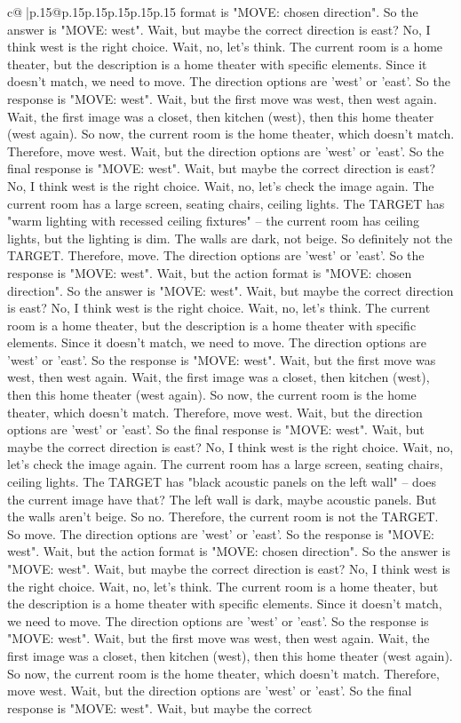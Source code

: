 \documentclass{article}
\begin{document}
{\begin{supertabular}{c@{$\;$}|p{.15\linewidth}@{}p{.15\linewidth}p{.15\linewidth}p{.15\linewidth}p{.15\linewidth}p{.15\linewidth}}
{{{format is "MOVE: chosen direction". So the answer is "MOVE: west". Wait, but maybe the correct direction is east? No, I think west is the right choice. Wait, no, let's think. The current room is a home theater, but the description is a home theater with specific elements. Since it doesn't match, we need to move. The direction options are 'west' or 'east'. So the response is "MOVE: west". Wait, but the first move was west, then west again. Wait, the first image was a closet, then kitchen (west), then this home theater (west again). So now, the current room is the home theater, which doesn't match. Therefore, move west. Wait, but the direction options are 'west' or 'east'. So the final response is "MOVE: west". Wait, but maybe the correct direction is east? No, I think west is the right choice. Wait, no, let's check the image again. The current room has a large screen, seating chairs, ceiling lights. The TARGET has "warm lighting with recessed ceiling fixtures" – the current room has ceiling lights, but the lighting is dim. The walls are dark, not beige. So definitely not the TARGET. Therefore, move. The direction options are 'west' or 'east'. So the response is "MOVE: west". Wait, but the action format is "MOVE: chosen direction". So the answer is "MOVE: west". Wait, but maybe the correct direction is east? No, I think west is the right choice. Wait, no, let's think. The current room is a home theater, but the description is a home theater with specific elements. Since it doesn't match, we need to move. The direction options are 'west' or 'east'. So the response is "MOVE: west". Wait, but the first move was west, then west again. Wait, the first image was a closet, then kitchen (west), then this home theater (west again). So now, the current room is the home theater, which doesn't match. Therefore, move west. Wait, but the direction options are 'west' or 'east'. So the final response is "MOVE: west". Wait, but maybe the correct direction is east? No, I think west is the right choice. Wait, no, let's check the image again. The current room has a large screen, seating chairs, ceiling lights. The TARGET has "black acoustic panels on the left wall" – does the current image have that? The left wall is dark, maybe acoustic panels. But the walls aren't beige. So no. Therefore, the current room is not the TARGET. So move. The direction options are 'west' or 'east'. So the response is "MOVE: west". Wait, but the action format is "MOVE: chosen direction". So the answer is "MOVE: west". Wait, but maybe the correct direction is east? No, I think west is the right choice. Wait, no, let's think. The current room is a home theater, but the description is a home theater with specific elements. Since it doesn't match, we need to move. The direction options are 'west' or 'east'. So the response is "MOVE: west". Wait, but the first move was west, then west again. Wait, the first image was a closet, then kitchen (west), then this home theater (west again). So now, the current room is the home theater, which doesn't match. Therefore, move west. Wait, but the direction options are 'west' or 'east'. So the final response is "MOVE: west". Wait, but maybe the correct }}}
\end{supertabular}}
\end{document}
